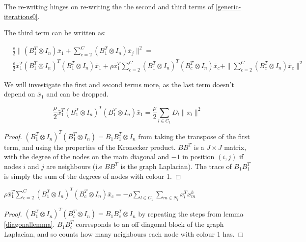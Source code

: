 \documentclass{article}
\begin{document}
The re-writing hinges on re-writing the the second and third terms of \eqref{generic-iterations0}. 

The third term can be written as:

\begin{align*}
&\frac{\rho}{2}\|\left(B_1^T \otimes I_n\right)\bar{x}_1 + \sum_{c=2}^C \left(B_1^T \otimes I_n\right)\bar{x}_j\|^2 = \\
& \frac{\rho}{2}\bar{x}_1^T  \left(B_1^T \otimes I_n\right)^T \left(B_1^T \otimes I_n\right) \bar{x}_1 + \rho \bar{x}_1^T \sum	_{c=2}^C \left(B_1^T \otimes I_n\right)^T \left(B_c^T \otimes I_n\right) \bar{x}_c + \|\sum_{c=2}^C  \left(B_c^T \otimes I_n\right) \bar{x}_c\|^2
\end{align*}

We will investigate the first and second terms more, as the last term doesn't depend on \(\bar{x}_1\) and can be dropped.

\begin{lemma}
\begin{equation}
\frac{\rho}{2}\bar{x}_1^T  \left(B_1^T \otimes I_n\right)^T \left(B_1^T \otimes I_n\right) \bar{x}_1 = \frac{\rho}{2}\sum_{l \in C_1} D_l \|x_l\|^2
\end{equation}

\begin{proof}
\(\left(B_1^T \otimes I_n\right)^T \left(B_1^T \otimes  I_n\right) = B_1B_1^T \otimes I_n\) from taking the transpose of the first term, and using the properties of the Kronecker product. \(BB^T\) is a \(J \times J\) matrix, with the degree of the nodes on the main diagonal and \(-1\) in position \(\left(i,j\right)\) if nodes \(i\) and \(j\) are neighbours (i.e \(BB^T\) is the graph Laplacian). The trace of \(B_1B_1^T\) is simply the sum of the degrees of nodes with colour 1. 
\end{proof}
\label{diagonallemma}
\end{lemma}

\begin{lemma}
\(\rho \bar{x}_1^T \sum	_{c=2}^C \left(B_1^T \otimes I_n\right)^T \left(B_c^T \otimes I_n\right) \bar{x}_c = -\rho\sum_{l\in C_1} \sum_{m\in N_l} x_l^Tx_m^k\)
\begin{proof}
\(\left(B_1^T \otimes I_n\right)^T \left(B_c^T \otimes  I_n\right) = B_1B_c^T \otimes I_n\) by repeating the steps from lemma \ref{diagonallemma}.  \(B_1B_c^T\) corresponds to an off diagonal block of the graph Laplacian, and so counts how many neighbours each node with colour 1 has.
\end{proof}
\label{lem:cross-terms}
\end{lemma}
\end{document}
